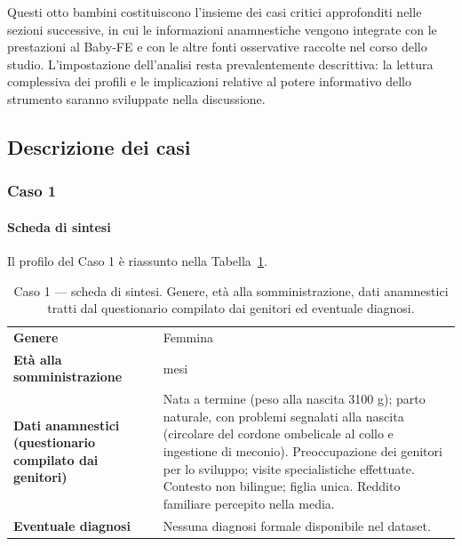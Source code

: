 Questi otto bambini costituiscono l'insieme dei casi critici approfonditi nelle sezioni successive, in cui le informazioni anamnestiche vengono integrate con le prestazioni al Baby-FE e con le altre fonti osservative raccolte nel corso dello studio. L'impostazione dell'analisi resta prevalentemente descrittiva: la lettura complessiva dei profili e le implicazioni relative al potere informativo dello strumento saranno sviluppate nella discussione.

\FloatBarrier

 \subsection{Descrizione dei casi}
 \label{sec:4_3_2}

 \subsubsection*{Caso 1}

 \paragraph*{Scheda di sintesi}

Il profilo del Caso 1 è riassunto nella Tabella~\ref{tab:caso1_scheda}.

\begin{table}[htbp]
\centering
\caption[Caso 1 --- scheda di sintesi]{Caso 1 --- scheda di sintesi. Genere, età alla somministrazione, dati anamnestici tratti dal questionario compilato dai genitori ed eventuale diagnosi.}
\label{tab:caso1_scheda}
\begin{tabular}{|>{\raggedright\arraybackslash}p{4.3cm}|>{\raggedright\arraybackslash}p{9.2cm}|}
\toprule
\textbf{Genere} & Femmina \\
\textbf{Età alla somministrazione} & 33 mesi \\
\textbf{Dati anamnestici (questionario compilato dai genitori)} & Nata a termine (peso alla nascita 3100 g); parto naturale, con problemi segnalati alla nascita (circolare del cordone ombelicale al collo e ingestione di meconio). Preoccupazione dei genitori per lo sviluppo; visite specialistiche effettuate. Contesto non bilingue; figlia unica. Reddito familiare percepito nella media. \\
\textbf{Eventuale diagnosi} & Nessuna diagnosi formale disponibile nel dataset. \\
\bottomrule
\end{tabular}
\end{table}

